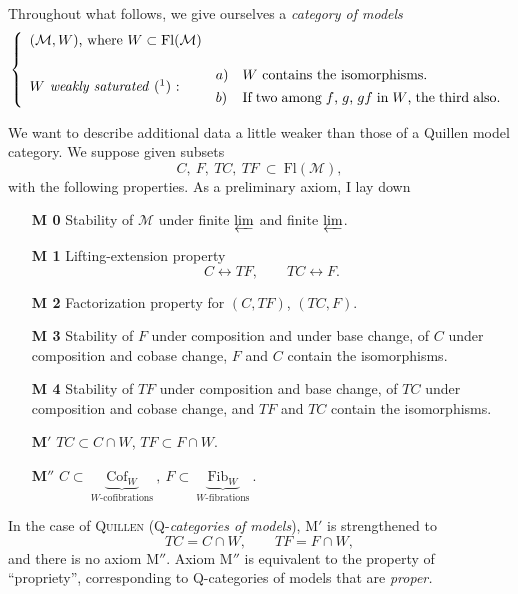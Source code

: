 \documentclass[11pt]{article}
\newcommand{\printedpage}[1]{\marginpar{\footnotesize p.~#1}}
\newcommand{\msp}[1]{\marginpar{\footnotesize [#1]}}
\newcommand{\cM}{\mathcal{M}}
\newcommand{\Fl}{\mathrm{Fl}}
\newcommand{\Cof}{\mathrm{Cof}}
\newcommand{\Fib}{\mathrm{Fib}}
\begin{document}
Throughout what follows, we give ourselves a \textit{category of models}
\[
\left\{
\begin{array}{ll}
\mbox{$(\cM,W)$, where $W\subset\Fl(\cM)$} & \\[3ex]
\mbox{\textit{$W$ weakly saturated} (\footnotemark) :} &
\begin{array}[c]{@{}l@{\quad}p{6.5cm}@{}}
a) & $W$ contains the isomorphisms.\\[1ex]
b) & If two among $f$, $g$, $gf$ in $W$, the third also.
\end{array}
\end{array}
\right.
\]

\printedpage{5}
We want to describe additional data a little weaker than those of a Quillen model category. We suppose given subsets
\[
C,\ F,\ TC,\ TF\ \subset\ \Fl(\cM),
\]
with the following properties. As a preliminary axiom, I lay down

\begin{itemize}[leftmargin=3em,labelsep=0.6em]
\item[\textbf{M 0}] Stability of $\cM$ under finite $\varprojlim$ and finite $\varprojlim$.

\item[\textbf{M 1}]\msp{page 8}Lifting-extension property
\[
C\longleftrightarrow TF,\qquad TC\longleftrightarrow F.
\]

\item[\textbf{M 2}] Factorization property for $(C,TF)$, $(TC,F)$.

\item[\textbf{M 3}] Stability of $F$ under composition and under base change, of $C$ under composition and cobase change, $F$ and $C$ contain the isomorphisms.

\item[\textbf{M 4}] Stability of $TF$ under composition and base change, of $TC$ under composition and cobase change, and $TF$ and $TC$ contain the isomorphisms.

\item[\textbf{M}$'$] $TC\subset C\cap W$, $TF\subset F\cap W$.

\item[\textbf{M}$''$] $C\subset\ \underbrace{\Cof_W}_{\text{$W$-cofibrations}}\ ,\ F\subset\ \underbrace{\Fib_W}_{\text{$W$-fibrations}}\ .$
\end{itemize}



In the case of \textsc{Quillen} (Q-\textit{categories of models}), M$'$ is strengthened to
\[
TC=C\cap W,\qquad TF=F\cap W,
\]
and there is no axiom M$''$. Axiom M$''$ is equivalent to the property of ``propriety'', corresponding to Q-categories of models that are \textit{proper.}
\end{document}
